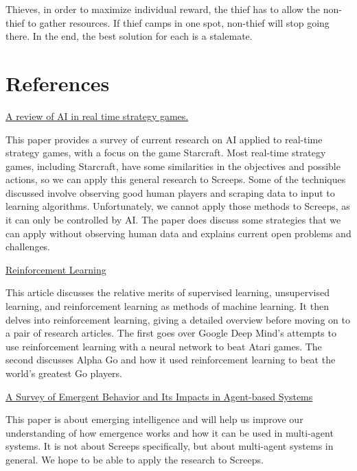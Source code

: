 \documentclass[11pt]{article}
\begin{document}
Thieves, in order to maximize individual reward, the thief has to allow the non-thief to gather resources. If thief camps in one spot, non-thief will stop going there. In the end, the best solution for each is a stalemate.

\section{References}


\href{http://www.cs.mun.ca/~dchurchill/pdf/starcraft_survey.pdf}{A review of AI in real time strategy games.}

This paper provides a survey of current research on AI applied to real-time strategy games, with a focus on the game Starcraft. Most real-time strategy games, including Starcraft, have some similarities in the objectives and possible actions, so we can apply this general research to Screeps. Some of the techniques discussed involve observing good human players and scraping data to input to learning algorithms. Unfortunately, we cannot apply those methods to Screeps, as it can only be controlled by AI. The paper does discuss some strategies that we can apply without observing human data and explains current open problems and challenges.


\noindent\href{https://adeshpande3.github.io/Deep-Learning-Research-Review-Week-2-Reinforcement-Learning}{Reinforcement Learning}

This article discusses the relative merits of supervised learning, unsupervised learning, and reinforcement learning as methods of machine learning. It then delves into reinforcement learning, giving a detailed overview before moving on to a pair of research articles. The first goes over Google Deep Mind’s attempts to use reinforcement learning with a neural network to beat Atari games. The second discusses Alpha Go and how it used reinforcement learning to beat the world’s greatest Go players.


\noindent\href{http://web.mysites.ntu.edu.sg/yhlow/public/Shared\%20Documents/papers/indin06-emergent.pdf}{A Survey of Emergent Behavior and Its Impacts in Agent-based Systems}

This paper is about emerging intelligence and will help us improve our understanding of how emergence works and how it can be used in multi-agent systems. It is not about Screeps specifically, but about multi-agent systems in general. We hope to be able to apply the research to Screeps.
\end{document}
